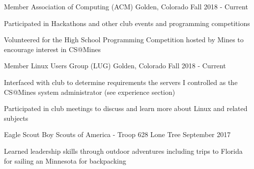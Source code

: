 \begin{cventries}
    \ifcv

    \cventry
    {Member}
    {Association of Computing (ACM)}
    {Golden, Colorado}
    {Fall 2018 - Current}
    {
      \begin{cvitems}
        \item Participated in Hackathons and other club events and programming competitions
        \item Volunteered for the High School Programming Competition hosted by Mines to encourage interest in CS@Mines
      \end{cvitems}
    }
    {}

    \cventry
    {Member}
    {Linux Users Group (LUG)}
    {Golden, Colorado}
    {Fall 2018 - Current}
    {
      \begin{cvitems}
        \item Interfaced with club to determine requirements the servers I controlled as the CS@Mines system administrator (see experience section)
        \item {Participated in club meetings to discuss and learn more about Linux and related subjects}
      \end{cvitems}
    }
    {}

    \cventry
    {Eagle Scout} %
    {Boy Scouts of America - Troop 628} %
    {Lone Tree} %
    {September 2017} %
    {
      \begin{cvitems} %
        \item {Learned leadership skills through outdoor adventures
            including trips to Florida for sailing an Minnesota for
            backpacking}
      \end{cvitems}
    }
    {}
    \fi

\end{cventries}
